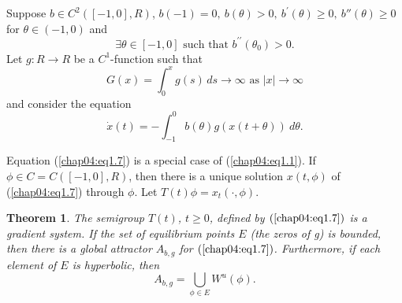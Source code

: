 \documentclass{surv-l}
\theoremstyle{plain}
\newtheorem{theorem}{Theorem}[section]
\theoremstyle{definition}
\numberwithin{equation}{section}
\numberwithin{figure}{chapter}
\begin{document}
Suppose $b\in C^{2}([-1,0], R)$, $b(-1)=0,\ b(\theta)>0,\ b^{\prime}(\theta)\geq 0,\ b''(\theta)\geq 0$ for $\theta\in(-1,0)$ and
\begin{equation}\label{chap04:eq1.5}
\exists\theta\in[-1,0] \text{ such that } b^{\prime\prime}(\theta_{0})>0.
\end{equation}
Let $g\!:R\rightarrow R$ be a $C^{1}$-function such that
\begin{equation}\label{chap04:eq1.6}
G(x)=\int_{0}^{x}g(s)\,ds\rightarrow\infty \text{ as } |x|\rightarrow\infty
\end{equation}
and consider the equation
\begin{equation}\label{chap04:eq1.7}
\dot{x}(t)=-\int_{-1}^{0}b(\theta)g(x(t+\theta))\ d\theta.
\end{equation}

Equation (\ref{chap04:eq1.7}) is a special case of (\ref{chap04:eq1.1}). If $\phi \in C=C([-1,0], R)$, then there is a unique solution $x(t, \phi)$ of (\ref{chap04:eq1.7}) through $\phi$. Let $T(t)\phi=x_{t}(\cdot, \phi)$.

\begin{theorem}\label{thm4.1.6}
The semigroup $T(t)$, $t\geq 0$, defined by $(\ref{chap04:eq1.7})$ is a gradient system. If the set of equilibrium points $E$ (the zeros of g) is bounded, then there is a global attractor $A_{b,g}$ for $(\ref{chap04:eq1.7})$. Furthermore, if each element of $E$ is hyperbolic, then
\begin{equation*}
A_{b,g}=\bigcup_{\phi\in E}W^{u}(\phi).
\end{equation*}
\end{theorem}
\end{document}

